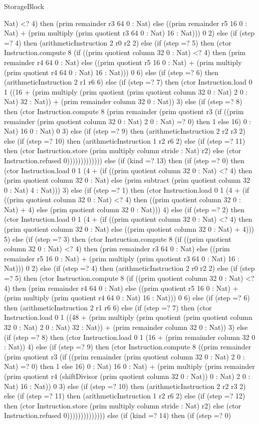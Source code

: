 \begin{lexlean}{StorageBlock}
\begin{semanticmodule}
{Nat) <? 4) then (prim remainder r3 64 0 : Nat) else ((prim remainder r5 16 0 : Nat) + (prim multiply (prim quotient r3 64 0 : Nat) 16 : Nat))) 0 2) else (if (step =? 4) then (arithmeticInstruction 2 r0 r2 2) else (if (step =? 5) then (ctor Instruction.compute 8 (if ((prim quotient column 32 0 : Nat) <? 4) then (prim remainder r4 64 0 : Nat) else ((prim quotient r5 16 0 : Nat) + (prim multiply (prim quotient r4 64 0 : Nat) 16 : Nat))) 0 6) else (if (step =? 6) then (arithmeticInstruction 2 r1 r6 6) else (if (step =? 7) then (ctor Instruction.load 0 1 ((16 + (prim multiply (prim quotient (prim quotient column 32 0 : Nat) 2 0 : Nat) 32 : Nat)) + (prim remainder column 32 0 : Nat)) 3) else (if (step =? 8) then (ctor Instruction.compute 8 (prim remainder (prim quotient r3 (if ((prim remainder (prim quotient column 32 0 : Nat) 2 0 : Nat) =? 0) then 1 else 16) 0 : Nat) 16 0 : Nat) 0 3) else (if (step =? 9) then (arithmeticInstruction 2 r2 r3 2) else (if (step =? 10) then (arithmeticInstruction 1 r2 r6 2) else (if (step =? 11) then (ctor Instruction.store (prim multiply column stride : Nat) r2) else (ctor Instruction.refused 0))))))))))))) else (if (kind =? 13) then (if (step =? 0) then (ctor Instruction.load 0 1 (4 + (if ((prim quotient column 32 0 : Nat) <? 4) then (prim quotient column 32 0 : Nat) else (prim subtract (prim quotient column 32 0 : Nat) 4 : Nat))) 3) else (if (step =? 1) then (ctor Instruction.load 0 1 (4 + (if ((prim quotient column 32 0 : Nat) <? 4) then ((prim quotient column 32 0 : Nat) + 4) else (prim quotient column 32 0 : Nat))) 4) else (if (step =? 2) then (ctor Instruction.load 0 1 (4 + (if ((prim quotient column 32 0 : Nat) <? 4) then (prim quotient column 32 0 : Nat) else ((prim quotient column 32 0 : Nat) + 4))) 5) else (if (step =? 3) then (ctor Instruction.compute 8 (if ((prim quotient column 32 0 : Nat) <? 4) then (prim remainder r3 64 0 : Nat) else ((prim remainder r5 16 0 : Nat) + (prim multiply (prim quotient r3 64 0 : Nat) 16 : Nat))) 0 2) else (if (step =? 4) then (arithmeticInstruction 2 r0 r2 2) else (if (step =? 5) then (ctor Instruction.compute 8 (if ((prim quotient column 32 0 : Nat) <? 4) then (prim remainder r4 64 0 : Nat) else ((prim quotient r5 16 0 : Nat) + (prim multiply (prim quotient r4 64 0 : Nat) 16 : Nat))) 0 6) else (if (step =? 6) then (arithmeticInstruction 2 r1 r6 6) else (if (step =? 7) then (ctor Instruction.load 0 1 ((48 + (prim multiply (prim quotient (prim quotient column 32 0 : Nat) 2 0 : Nat) 32 : Nat)) + (prim remainder column 32 0 : Nat)) 3) else (if (step =? 8) then (ctor Instruction.load 0 1 (16 + (prim remainder column 32 0 : Nat)) 4) else (if (step =? 9) then (ctor Instruction.compute 8 ((prim remainder (prim quotient r3 (if ((prim remainder (prim quotient column 32 0 : Nat) 2 0 : Nat) =? 0) then 1 else 16) 0 : Nat) 16 0 : Nat) + (prim multiply (prim remainder (prim quotient r4 (shiftDivisor (prim quotient column 32 0 : Nat)) 0 : Nat) 2 0 : Nat) 16 : Nat)) 0 3) else (if (step =? 10) then (arithmeticInstruction 2 r2 r3 2) else (if (step =? 11) then (arithmeticInstruction 1 r2 r6 2) else (if (step =? 12) then (ctor Instruction.store (prim multiply column stride : Nat) r2) else (ctor Instruction.refused 0)))))))))))))) else (if (kind =? 14) then (if (step =? 0) }
\end{semanticmodule}
\end{lexlean}
